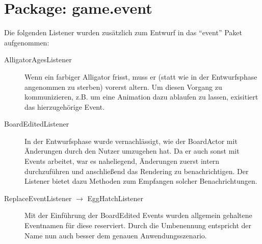 \section{Package: game.event}
Die folgenden Listener wurden zusätzlich zum Entwurf in das "`event"' Paket aufgenommen:
\begin{description}
	\item[AlligatorAgesListener]
		Wenn ein farbiger Alligator frisst, muss er (statt wie in der Entwurfsphase angenommen zu sterben) vorerst altern.
		Um diesen Vorgang zu kommunizieren, z.B. um eine Animation dazu ablaufen zu lassen, exisitiert das hierzugehörige Event.
	\item[BoardEditedListener]
		In der Entwurfsphase wurde vernachlässigt, wie der BoardActor mit Änderungen durch den Nutzer umzugehen hat.
		Da er auch sonst mit Events arbeitet, war es naheliegend, Änderungen zuerst intern durchzuführen und anschließend das Rendering zu benachrichtigen.
		Der Listener bietet dazu Methoden zum Empfangen solcher Benachrichtungen.
	\item[ReplaceEventListener $\rightarrow$ EggHatchListener]
		Mit der Einführung der BoardEdited Events wurden allgemein gehaltene Eventnamen für diese reserviert.
		Durch die Umbenennung entspricht der Name nun auch besser dem genauen Anwendungsszenario.
\end{description}
